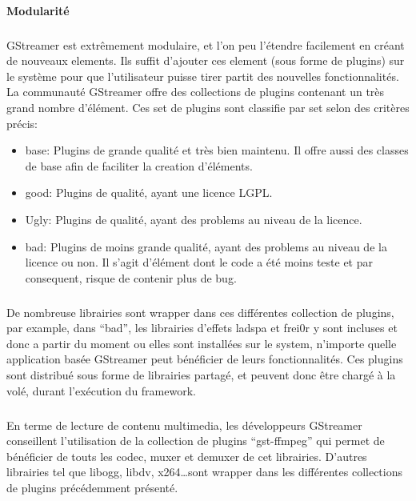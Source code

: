 \paragraph {Modularité}

\subparagraph{}

GStreamer est extrêmement modulaire, et l'on peu l'étendre facilement
en créant de nouveaux elements. Ils suffit d'ajouter ces element (sous
forme de plugins) sur le système pour que l'utilisateur puisse tirer
partit des nouvelles fonctionnalités. La communauté GStreamer offre des
collections de plugins contenant un très grand nombre d'élément. Ces
set de plugins sont classifie par set selon des critères précis:

\begin{itemize}

  \item {base: Plugins de grande qualité et très bien maintenu. Il
  offre aussi
    des classes de base afin de faciliter la creation d'éléments.}

  \item {good: Plugins de qualité, ayant une licence LGPL}.

  \item {Ugly: Plugins de qualité, ayant des problems au niveau de
  la licence.}

  \item {bad: Plugins de moins grande qualité, ayant des problems
  au niveau
    de la licence ou non. Il s'agit d'élément dont le code a été
    moins teste et par consequent, risque de contenir plus de bug.}

\end{itemize}

\subparagraph{}

De nombreuse librairies sont wrapper dans ces différentes collection de plugins, par example, dans ``bad'', les librairies d'effets ladspa
et frei0r y sont incluses et donc a partir du moment ou elles sont
installées sur le system, n'importe quelle application basée GStreamer
peut bénéficier de leurs fonctionnalités.  Ces plugins sont distribué
sous forme de librairies partagé, et peuvent donc être chargé à la
volé, durant l'exécution du framework.

\subparagraph{}

En terme de lecture de contenu multimedia, les développeurs GStreamer
conseillent l'utilisation de la collection de plugins ``gst-ffmpeg''
qui permet de bénéficier de touts les codec, muxer et demuxer de cet
librairies. D'autres librairies tel que libogg, libdv, x264\ldots sont
wrapper dans les différentes collections de plugins précédemment
présenté.

